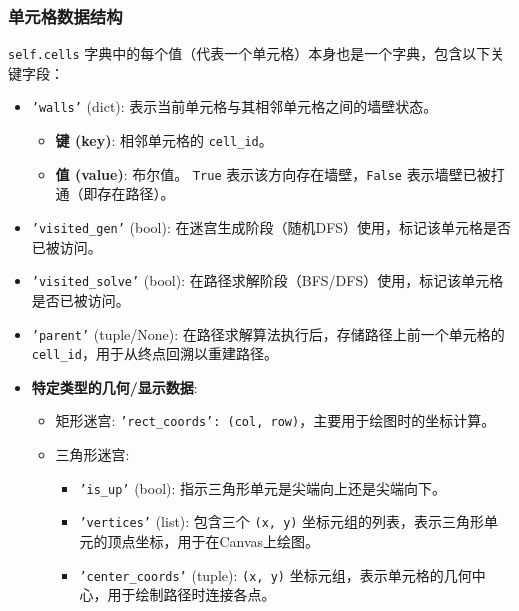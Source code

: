\documentclass[UTF8]{report}
\theoremstyle{MyLineTheoremStyle} %
\theoremstyle{MyBlockTheoremStyle} %
\theoremstyle{MySubsubsectionStyle} %
\begin{document}
\subsubsection{单元格数据结构}
\texttt{self.cells} 字典中的每个值（代表一个单元格）本身也是一个字典，包含以下关键字段：
\begin{itemize}
    \item \texttt{'walls'} (dict): 表示当前单元格与其相邻单元格之间的墙壁状态。
    \begin{itemize}
        \item \textbf{键 (key)}: 相邻单元格的 \texttt{cell\_id}。
        \item \textbf{值 (value)}: 布尔值。 \texttt{True} 表示该方向存在墙壁，\texttt{False} 表示墙壁已被打通（即存在路径）。
    \end{itemize}
    \item \texttt{'visited\_gen'} (bool): 在迷宫生成阶段（随机DFS）使用，标记该单元格是否已被访问。
    \item \texttt{'visited\_solve'} (bool): 在路径求解阶段（BFS/DFS）使用，标记该单元格是否已被访问。
    \item \texttt{'parent'} (tuple/None): 在路径求解算法执行后，存储路径上前一个单元格的 \texttt{cell\_id}，用于从终点回溯以重建路径。
    \item \textbf{特定类型的几何/显示数据}:
    \begin{itemize}
        \item 矩形迷宫: \texttt{'rect\_coords': (col, row)}，主要用于绘图时的坐标计算。
        \item 三角形迷宫:
        \begin{itemize}
            \item \texttt{'is\_up'} (bool): 指示三角形单元是尖端向上还是尖端向下。
            \item \texttt{'vertices'} (list): 包含三个 \texttt{(x, y)} 坐标元组的列表，表示三角形单元的顶点坐标，用于在Canvas上绘图。
            \item \texttt{'center\_coords'} (tuple): \texttt{(x, y)} 坐标元组，表示单元格的几何中心，用于绘制路径时连接各点。
        \end{itemize}
    \end{itemize}
\end{itemize}
\end{document}
